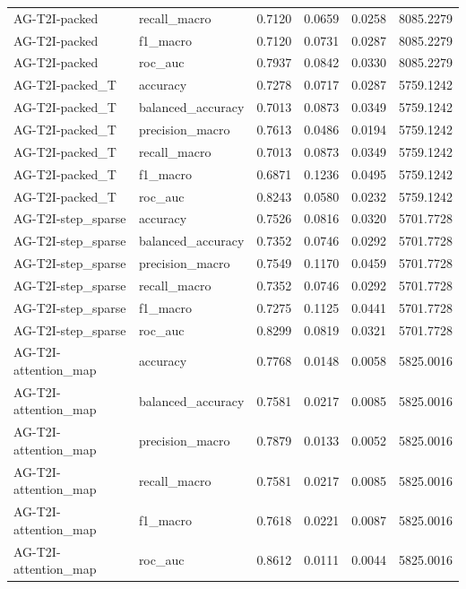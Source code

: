 \begin{tabular}{llrrrr}
AG-T2I-packed & recall_macro & 0.7120 & 0.0659 & 0.0258 & 8085.2279 \\
AG-T2I-packed & f1_macro & 0.7120 & 0.0731 & 0.0287 & 8085.2279 \\
AG-T2I-packed & roc_auc & 0.7937 & 0.0842 & 0.0330 & 8085.2279 \\
AG-T2I-packed_T & accuracy & 0.7278 & 0.0717 & 0.0287 & 5759.1242 \\
AG-T2I-packed_T & balanced_accuracy & 0.7013 & 0.0873 & 0.0349 & 5759.1242 \\
AG-T2I-packed_T & precision_macro & 0.7613 & 0.0486 & 0.0194 & 5759.1242 \\
AG-T2I-packed_T & recall_macro & 0.7013 & 0.0873 & 0.0349 & 5759.1242 \\
AG-T2I-packed_T & f1_macro & 0.6871 & 0.1236 & 0.0495 & 5759.1242 \\
AG-T2I-packed_T & roc_auc & 0.8243 & 0.0580 & 0.0232 & 5759.1242 \\
AG-T2I-step_sparse & accuracy & 0.7526 & 0.0816 & 0.0320 & 5701.7728 \\
AG-T2I-step_sparse & balanced_accuracy & 0.7352 & 0.0746 & 0.0292 & 5701.7728 \\
AG-T2I-step_sparse & precision_macro & 0.7549 & 0.1170 & 0.0459 & 5701.7728 \\
AG-T2I-step_sparse & recall_macro & 0.7352 & 0.0746 & 0.0292 & 5701.7728 \\
AG-T2I-step_sparse & f1_macro & 0.7275 & 0.1125 & 0.0441 & 5701.7728 \\
AG-T2I-step_sparse & roc_auc & 0.8299 & 0.0819 & 0.0321 & 5701.7728 \\
AG-T2I-attention_map & accuracy & 0.7768 & 0.0148 & 0.0058 & 5825.0016 \\
AG-T2I-attention_map & balanced_accuracy & 0.7581 & 0.0217 & 0.0085 & 5825.0016 \\
AG-T2I-attention_map & precision_macro & 0.7879 & 0.0133 & 0.0052 & 5825.0016 \\
AG-T2I-attention_map & recall_macro & 0.7581 & 0.0217 & 0.0085 & 5825.0016 \\
AG-T2I-attention_map & f1_macro & 0.7618 & 0.0221 & 0.0087 & 5825.0016 \\
AG-T2I-attention_map & roc_auc & 0.8612 & 0.0111 & 0.0044 & 5825.0016 \\
\bottomrule
\end{tabular}
